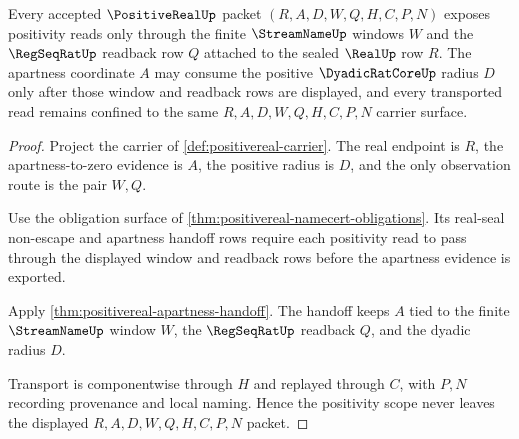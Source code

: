 \begin{theorem}
\label{thm:positivereal-regseqrat-window-positivity-scope}
Every accepted $\PositiveRealUp$ packet $(R,A,D,W,Q,H,C,P,N)$ exposes positivity reads only through the finite $\StreamNameUp$ windows $W$ and the $\RegSeqRatUp$ readback row $Q$ attached to the sealed $\RealUp$ row $R$. The apartness coordinate $A$ may consume the positive $\DyadicRatCoreUp$ radius $D$ only after those window and readback rows are displayed, and every transported read remains confined to the same $R,A,D,W,Q,H,C,P,N$ carrier surface.
\end{theorem}
\begin{proof}
Project the carrier of \autoref{def:positivereal-carrier}. The real endpoint is $R$, the apartness-to-zero evidence is $A$, the positive radius is $D$, and the only observation route is the pair $W,Q$.

Use the obligation surface of \autoref{thm:positivereal-namecert-obligations}. Its real-seal non-escape and apartness handoff rows require each positivity read to pass through the displayed window and readback rows before the apartness evidence is exported.

Apply \autoref{thm:positivereal-apartness-handoff}. The handoff keeps $A$ tied to the finite $\StreamNameUp$ window $W$, the $\RegSeqRatUp$ readback $Q$, and the dyadic radius $D$.

Transport is componentwise through $H$ and replayed through $C$, with $P,N$ recording provenance and local naming. Hence the positivity scope never leaves the displayed $R,A,D,W,Q,H,C,P,N$ packet.
\end{proof}

